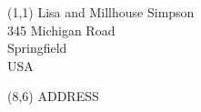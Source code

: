 \documentclass[a6paper,landscape]{scrartcl}
\begin{document}
\begin{textblock}{6}(1,1)
Lisa and Millhouse Simpson\\
345 Michigan Road\\
Springfield\\
USA
\end{textblock}

\begin{textblock}{6}(8,6)
ADDRESS
\end{textblock}
\end{document}
